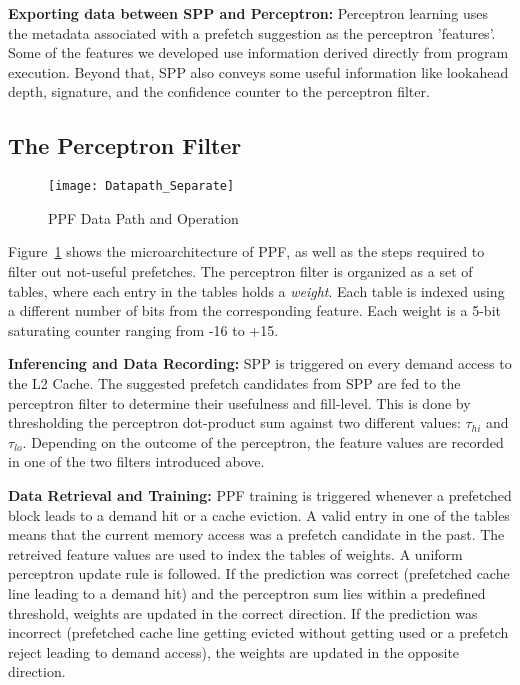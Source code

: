 \noindent \textbf{Exporting data between SPP and Perceptron:}
Perceptron learning uses the metadata associated with a prefetch suggestion as the
perceptron 'features'. Some of the features we developed use information derived 
directly from program execution. Beyond that, SPP also conveys some useful 
information like lookahead depth, signature, and the confidence counter to the 
perceptron filter.

\subsection{The Perceptron Filter}
\label{Enhancements-PPF}

\begin{figure}[ht]
  \begin{center}
  \texttt{[image: Datapath\_Separate]}
  \caption{PPF Data Path and Operation}
  \label{fig:PPF_Datapath}
  \end{center}
\end{figure}

Figure~\ref{fig:PPF_Datapath} shows the microarchitecture of PPF, as
well as the steps required to filter out not-useful prefetches. The
perceptron filter is organized as a set of tables, where each entry in
the tables holds a \textit{weight}. Each table is indexed using a 
different number of bits from the corresponding feature. Each
weight is a 5-bit saturating counter ranging from -16 to +15. 

\noindent \textbf{Inferencing and Data Recording:}
SPP is triggered on every demand access to the L2 Cache. The suggested 
prefetch candidates from SPP are fed to the perceptron filter to determine 
their usefulness and fill-level. This is done by thresholding the perceptron 
dot-product sum against two different values: $\tau_{hi}$ and $\tau_{lo}$.
Depending on the outcome of the perceptron, the feature values are recorded
in one of the two filters introduced above.

\noindent \textbf{Data Retrieval and Training:}
PPF training is triggered whenever a prefetched block leads to a demand hit
or a cache eviction. A valid entry in one of the tables means that the current
memory access was a prefetch candidate in the past. The retreived feature values 
are used to index the tables of weights. A uniform perceptron update rule
is followed. If the prediction was correct (prefetched cache line leading to a 
demand hit) and the perceptron sum lies within a predefined threshold, weights are 
updated in the correct direction. If the prediction was incorrect (prefetched cache 
line getting evicted without getting used or a prefetch reject leading to demand 
access), the weights are updated in the opposite direction.

